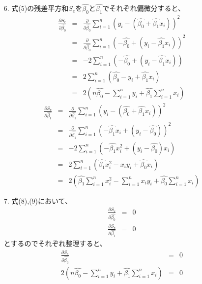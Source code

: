 \documentclass[12pt]{jarticle}
\begin{document}
\begin{itemize}
    \item [6.]式(5)の残差平方和$S_e$を$\hat{\beta_0}$と$\hat{\beta_1}$でそれぞれ偏微分すると、
          \begin{eqnarray}
              \frac{\partial S_e}{\partial \hat{\beta_0}}&=& \frac{\partial}{\partial \hat{\beta_0}}\sum_{i=1}^{n} (y_i-(\hat{\beta_0}+\hat{\beta_1}x_i))^2 \nonumber \\
              &=& \frac{\partial}{\partial \hat{\beta_0}}\sum_{i=1}^{n} (-\hat{\beta_0}+(y_i-\hat{\beta_1}x_i))^2 \nonumber \\
              &=& -2\sum_{i=1}^{n} (-\hat{\beta_0}+(y_i-\hat{\beta_1}x_i)) \nonumber \\
              &=& 2\sum_{i=1}^{n} (\hat{\beta_0}-y_i+\hat{\beta_1}x_i) \nonumber \\
              &=& 2(n\hat{\beta_0}-\sum_{i=1}^{n}y_i+\hat{\beta_1}\sum_{i=1}^{n}x_i)
          \end{eqnarray}
          \begin{eqnarray}
              \frac{\partial S_e}{\partial \hat{\beta_1}}&=& \frac{\partial}{\partial \hat{\beta_1}}\sum_{i=1}^{n} (y_i-(\hat{\beta_0}+\hat{\beta_1}x_i))^2 \nonumber \\
              &=& \frac{\partial}{\partial \hat{\beta_1}}\sum_{i=1}^{n} (-\hat{\beta_1}x_i+(y_i-\hat{\beta_0}))^2 \nonumber \\
              &=& -2\sum_{i=1}^{n} (-\hat{\beta_1}x_i^2+(y_i-\hat{\beta_0})x_i) \nonumber \\
              &=& 2\sum_{i=1}^{n} (\hat{\beta_1}x_i^2-x_iy_i+\hat{\beta_0}x_i) \nonumber \\
              &=& 2(\hat{\beta_1}\sum_{i=1}^{n}x_i^2-\sum_{i=1}^{n} x_iy_i+\hat{\beta_0}\sum_{i=1}^{n} x_i)
          \end{eqnarray}
    \item [7.]式(8),(9)において、
          \begin{eqnarray}
              \frac{\partial S_e}{\partial \hat{\beta_0}} &=&0 \nonumber \\
              \frac{\partial S_e}{\partial \hat{\beta_1}}&=&0 \nonumber
          \end{eqnarray}
          とするのでそれぞれ整理すると、
          \begin{eqnarray}
              \frac{\partial S_e}{\partial \hat{\beta_0}} &=&0 \nonumber \\
              2(n\hat{\beta_0}-\sum_{i=1}^{n}y_i+\hat{\beta_1}\sum_{i=1}^{n}x_i)&=&0 \nonumber \\

\end{eqnarray}
\end{itemize}
\end{document}
